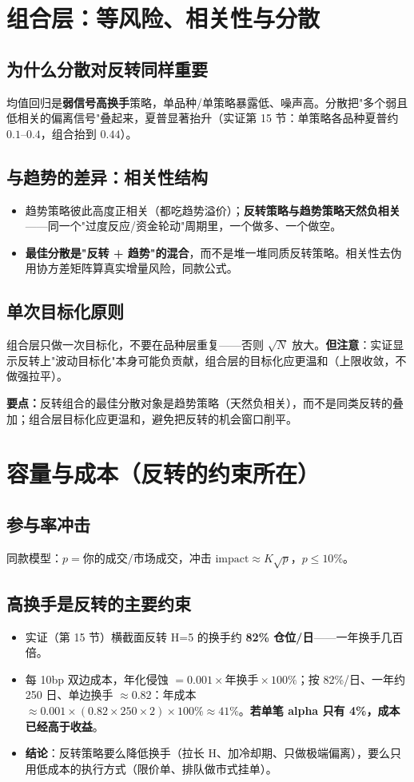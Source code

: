 \documentclass[UTF8,11pt]{ctexart}
\newcommand{\takeaway}[1]{\medskip\par\noindent\textbf{要点：}#1\par\medskip}
\begin{document}
\section{组合层：等风险、相关性与分散}
\subsection{为什么分散对反转同样重要}
均值回归是\textbf{弱信号高换手}策略，单品种/单策略暴露低、噪声高。分散把"多个弱且低相关的偏离信号"叠起来，夏普显著抬升（实证第 15 节：单策略各品种夏普约 $0.1$--$0.4$，组合抬到 $0.44$）。
\subsection{与趋势的差异：相关性结构}
\begin{itemize}[itemsep=2pt]
\item 趋势策略彼此高度正相关（都吃趋势溢价）；\textbf{反转策略与趋势策略天然负相关}——同一个"过度反应/资金轮动"周期里，一个做多、一个做空。
\item \textbf{最佳分散是"反转 + 趋势"的混合}，而不是堆一堆同质反转策略。相关性去伪用协方差矩阵算真实增量风险，同款公式。
\end{itemize}
\subsection{单次目标化原则}
组合层只做一次目标化，不要在品种层重复——否则 $\sqrt N$ 放大。\textbf{但注意}：实证显示反转上"波动目标化"本身可能负贡献，组合层的目标化应更温和（上限收敛，不做强拉平）。

\takeaway{反转组合的最佳分散对象是趋势策略（天然负相关），而不是同类反转的叠加；组合层目标化应更温和，避免把反转的机会窗口削平。}

\section{容量与成本（反转的约束所在）}
\subsection{参与率冲击}
同款模型：$p=\text{你的成交}/\text{市场成交}$，冲击 $\text{impact}\approx K\sqrt{p}$，$p\le10\%$。
\subsection{高换手是反转的主要约束}
\begin{itemize}[itemsep=2pt]
\item 实证（第 15 节）横截面反转 H=5 的换手约 \textbf{82\% 仓位/日}——一年换手几百倍。
\item 每 10bp 双边成本，年化侵蚀 $=0.001\times\text{年换手}\times100\%$；按 82\%/日、一年约 250 日、单边换手 $\approx 0.82$：年成本 $\approx 0.001\times(0.82\times250\times2)\times100\%\approx41\%$。\textbf{若单笔 alpha 只有 4\%，成本已经高于收益}。
\item \textbf{结论}：反转策略要么降低换手（拉长 H、加冷却期、只做极端偏离），要么只用低成本的执行方式（限价单、排队做市式挂单）。
\end{itemize}
\end{document}
